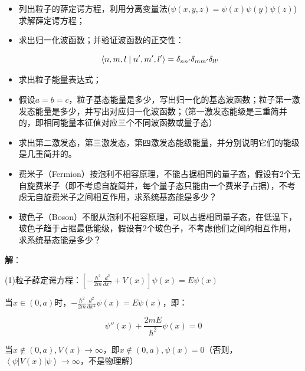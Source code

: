 \begin{itemize}
    \item 列出粒子的薛定谔方程，利用分离变量法($\psi (x,y,z) = \psi (x)\psi (y)\psi (z)$)求解薛定谔方程；
    \item 求出归一化波函数；并验证波函数的正交性：
    
\begin{equation*}
\left\langle {{n,m,l}}
 \mathrel{\left | {\vphantom {{n,m,l} {n',m',l'}}}
 \right. \kern-\nulldelimiterspace}
 {{n',m',l'}} \right\rangle  = \delta _{nn'} \delta _{mm'} \delta _{ll'} 
\end{equation*}
    
    
   \item 求出粒子能量表达式；
   
    \item 假设$a=b=c$，粒子基态能量是多少，写出归一化的基态波函数；粒子第一激发态能量是多少，并写出对应归一化波函数；（第一激发态能级是三重简并的，即相同能量本征值对应三个不同波函数或量子态）
    \item 求出第二激发态，第三激发态，第四激发态能级能量，并分别说明它们的能级是几重简并的。
    \item 费米子（Fermion）按泡利不相容原理，不能占据相同的量子态，假设有2个无自旋费米子（即不考虑自旋简并，每个量子态只能由一个费米子占据），不考虑无自旋费米子之间相互作用，求系统基态能是多少？
    \item 玻色子（Boson）不服从泡利不相容原理，可以占据相同量子态，在低温下，玻色子趋于占据最低能级，假设有2个玻色子，不考虑他们之间的相互作用，求系统基态能是多少？

   \end{itemize}



\textbf{解}：

(1)粒子薛定谔方程：$\left[ { - \frac{{\hbar ^2 }}{{2m}}\frac{{d^2 }}{{dx^2 }} + V(x)} \right]\psi (x) = E\psi (x)$


当$x \in \left( {0,a} \right)$时，$ - \frac{{\hbar ^2 }}{{2m}}\frac{{d^2 }}{{dx^2 }}\psi (x) = E\psi (x)$，即：

\begin{equation}\label{9-1-1}
\psi ''(x) + \frac{{2mE}}{{\hbar ^2 }}\psi (x) = 0
\end{equation}

当$x \notin \left( {0,a} \right),V(x) \to \infty $，即$x \notin \left( {0,a} \right),\psi (x) = 0$（否则，$\left\langle \psi  \right|V(x)\left| \psi  \right\rangle  \to \infty $，不是物理解）


